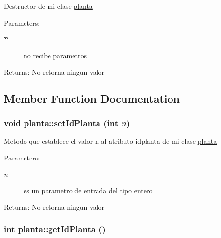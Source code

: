 Destructor de mi clase \hyperlink{classplanta}{planta} \begin{Desc}
\item[Parameters:]
\begin{description}
\item[{\em \char`\"{}\char`\"{}}]no recibe parametros \end{description}
\end{Desc}
\begin{Desc}
\item[Returns:]No retorna ningun valor \end{Desc}


\subsection{Member Function Documentation}
\hypertarget{classplanta_cd23abae2d6e377abe25d48d850f7319}{
\subsubsection[setIdPlanta]{\setlength{\rightskip}{0pt plus 5cm}void planta::setIdPlanta (int {\em n})}}
\label{classplanta_cd23abae2d6e377abe25d48d850f7319}


Metodo que establece el valor n al atributo idplanta de mi clase \hyperlink{classplanta}{planta} \begin{Desc}
\item[Parameters:]
\begin{description}
\item[{\em n}]es un parametro de entrada del tipo entero \end{description}
\end{Desc}
\begin{Desc}
\item[Returns:]No retorna ningun valor \end{Desc}
\hypertarget{classplanta_6e9b552f6542f68eca605ed69a283980}{
\subsubsection[getIdPlanta]{\setlength{\rightskip}{0pt plus 5cm}int planta::getIdPlanta ()}}
\label{classplanta_6e9b552f6542f68eca605ed69a283980}


